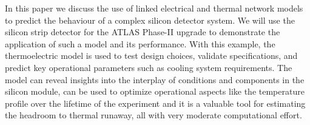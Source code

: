 
%
%

In this paper we discuss the use of linked electrical and thermal network models to predict the behaviour of a complex silicon detector system. We will use the silicon strip detector for the ATLAS Phase-II upgrade to demonstrate the application of such a model and its performance. With this example, the thermoelectric model is used to test design choices, validate specifications, and predict key operational parameters such as cooling system requirements. The model can reveal insights into the interplay of conditions and components in the silicon module, can be used to optimize operational aspects like the temperature profile over the lifetime of the experiment and it is a valuable tool for estimating the headroom to thermal runaway, all with very moderate computational effort.
